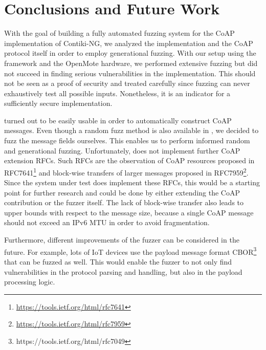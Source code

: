 \section{Conclusions and Future Work}
\label{section:conclusion}


With the goal of building a fully automated fuzzing system for the CoAP implementation of Contiki-NG, we analyzed the implementation and the CoAP protocol itself in order to employ generational fuzzing. With our setup using the \python framework \scapy and the OpenMote hardware, we performed extensive fuzzing but did not succeed in finding serious vulnerabilities in the implementation. This should not be seen as a proof of security and treated carefully since fuzzing can never exhaustively test all possible inputs. Nonetheless, it is an indicator for a sufficiently secure implementation.

\scapy turned out to be easily usable in order to automatically construct CoAP messages. Even though a random fuzz method is also available in \scapy, we decided to fuzz the message fields ourselves. This enables us to perform informed random and generational fuzzing. Unfortunately, \scapy does not implement further CoAP extension RFCs. Such RFCs are the observation of CoAP resources proposed in RFC7641\footnote{\url{https://tools.ietf.org/html/rfc7641}} and block-wise transfers of larger messages proposed in RFC7959\footnote{\url{https://tools.ietf.org/html/rfc7959}}. Since the system under test does implement these RFCs, this would be a starting point for further research and could be done by either extending the \scapy CoAP contribution or the fuzzer itself. The lack of block-wise transfer also leads to upper bounds with respect to the message size, because a single CoAP message should not exceed an IPv6 MTU in order to avoid fragmentation.

Furthermore, different improvements of the fuzzer can be considered in the future. For example, lots of IoT devices use the payload message format CBOR\footnote{https://tools.ietf.org/html/rfc7049} that can be fuzzed as well. This would enable the fuzzer to not only find vulnerabilities in the protocol parsing and handling, but also in the payload processing logic. 

